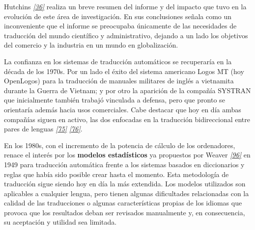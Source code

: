 \documentclass[a4paper,12pt,spanish]{book}
\begin{document}
Hutchins \label{0.intro:id18}{\hyperref[zreferences:hutchins2003]{\emph{{[}36{]}}}} realiza un breve resumen del informe y del impacto
que tuvo en la evolución de este área de investigación. En sus conclusiones señala
como un inconveniente que el informe se preocupaba únicamente de las necesidades
de traducción del mundo científico y administrativo, dejando a un lado los objetivos
del comercio y la industria en un mundo en globalización.

La confianza en los sistemas de traducción automáticos se recuperaría en la década de
los 1970s. Por un lado el éxito del sistema americano Logos MT (hoy OpenLogos) para
la traducción de manuales militares de inglés a vietnamita durante la Guerra de
Vietnam; y por otro la aparición de la compañía SYSTRAN que inicialmente también
trabajó vinculada a defensa, pero que pronto se orientaría además hacia usos comerciales.
Cabe destacar que hoy en día ambas compañías siguen en activo, las dos enfocadas en la
traducción bidireccional entre pares de lenguas \label{0.intro:id19}{\hyperref[zreferences:scott2009]{\emph{{[}75{]}}}} \label{0.intro:id20}{\hyperref[zreferences:senellart2001]{\emph{{[}76{]}}}}.

En los 1980s, con el incremento de la potencia de cálculo de los ordenadores, renace
el interés por los \textbf{modelos estadísticos} ya propuestos por Weaver
\label{0.intro:id21}{\hyperref[zreferences:weaver1949]{\emph{{[}96{]}}}} en 1949 para traducción automática frente a los
sistemas basados en diccionarios y reglas que había sido posible crear hasta el
momento. Esta metodología de traducción sigue siendo hoy en día la más extendida.
Los modelos utilizados son aplicables a cualquier lengua, pero tienen algunas
dificultades relacionadas con la calidad de las traducciones o algunas
características propias de los idiomas que provoca que los resultados deban ser
revisados manualmente y, en consecuencia, su aceptación y utilidad sea limitada.
\end{document}
